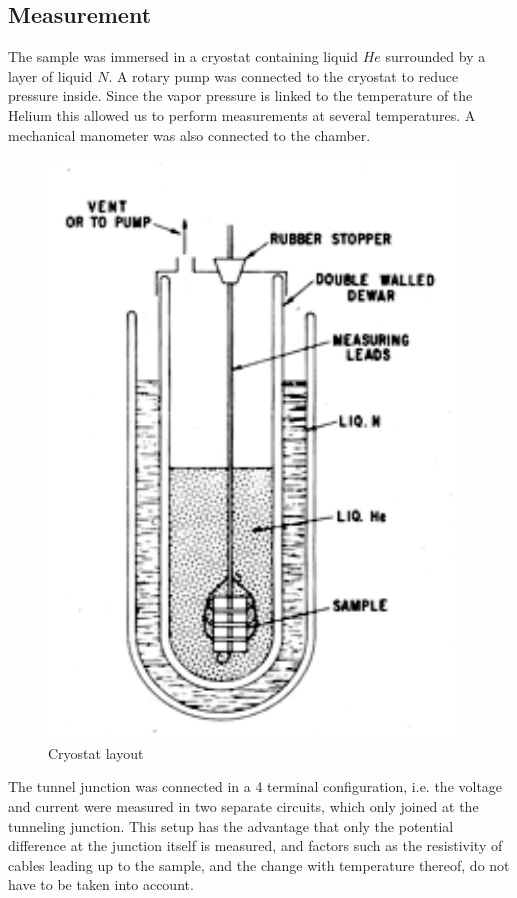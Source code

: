 {
\subsection{Measurement}
The sample was immersed in a cryostat containing liquid $He$ surrounded by a layer of liquid $N$. A rotary pump was connected to the cryostat to reduce pressure inside. Since the vapor pressure is linked to the temperature of the Helium this allowed us to perform measurements at several temperatures. A mechanical manometer was also connected to the chamber.

\begin{figure}
\centering
\includegraphics[scale=0.6]{cryostat.pdf}
\caption{Cryostat layout\label{cryostat}}
\end{figure}


The tunnel junction was connected in a 4 terminal configuration, i.e. the voltage and current were measured in two separate circuits, which only joined at the tunneling junction. This setup has the advantage that only the potential difference at the junction itself is measured, and factors such as the resistivity of cables leading up to the sample, and the change with temperature thereof, do not have to be taken into account. 

}
